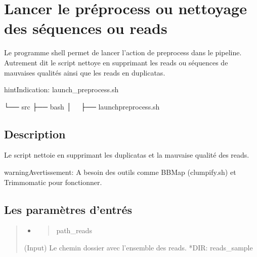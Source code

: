 \documentclass[letterpaper,10pt,french]{sphinxmanual}
\begin{document}
\section{Lancer le préprocess ou nettoyage des séquences ou reads}
\label{\detokenize{bash/launch_preprocess.sh:lancer-le-preprocess-ou-nettoyage-des-sequences-ou-reads}}\label{\detokenize{bash/launch_preprocess.sh::doc}}
Le programme shell permet de lancer l’action de preprocess dans le pipeline. Autrement dit le script nettoye en supprimant les reads ou séquences de mauvaises qualités ainsi que les reads en duplicatas.

\begin{sphinxadmonition}{hint}{Indication:}
launch\_preprocess.sh
\end{sphinxadmonition}

\begin{sphinxVerbatim}[commandchars=\\\{\}]
└── src
 ├── bash
 │   ├── launch\PYGZus{}preprocess.sh
\end{sphinxVerbatim}


\subsection{Description}
\label{\detokenize{bash/launch_preprocess.sh:description}}
Le script nettoie en supprimant les duplicatas et la mauvaise qualité des reads.

\begin{sphinxadmonition}{warning}{Avertissement:}
A besoin des outils comme BBMap (clumpify.sh) et  Trimmomatic pour fonctionner.
\end{sphinxadmonition}


\subsection{Les paramètres d’entrés}
\label{\detokenize{bash/launch_preprocess.sh:les-parametres-d-entres}}\begin{quote}
\begin{itemize}
\item {} \begin{quote}\begin{description}
\item[{\sphinxhyphen{}path\_reads}] \leavevmode
\end{description}\end{quote}

\end{itemize}

(Input)  Le chemin dossier avec l’ensemble des reads. *DIR: reads\_sample
\end{quote}
\end{document}
